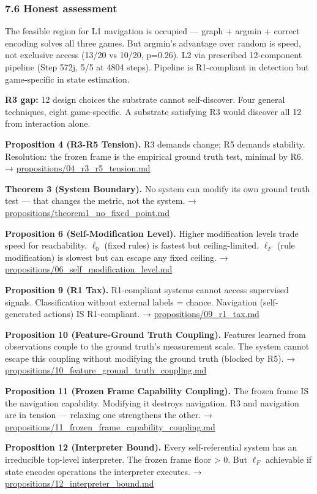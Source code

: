 \documentclass[
  11pt,
]{article}
\begin{document}
\subsubsection{7.6 Honest assessment}\label{honest-assessment}

The feasible region for L1 navigation is occupied --- graph + argmin +
correct encoding solves all three games. But argmin's advantage over
random is speed, not exclusive access (13/20 vs 10/20, p=0.26). L2 via
prescribed 12-component pipeline (Step 572j, 5/5 at 4804 steps).
Pipeline is R1-compliant in detection but game-specific in state
estimation.

\textbf{R3 gap:} 12 design choices the substrate cannot self-discover.
Four general techniques, eight game-specific. A substrate satisfying R3
would discover all 12 from interaction alone.

\textbf{Proposition 4 (R3-R5 Tension).} R3 demands change; R5 demands
stability. Resolution: the frozen frame is the empirical ground truth
test, minimal by R6. → \url{propositions/04_r3_r5_tension.md}

\textbf{Theorem 3 (System Boundary).} No system can modify its own
ground truth test --- that changes the metric, not the system. →
\url{propositions/theorem1_no_fixed_point.md}

\textbf{Proposition 6 (Self-Modification Level).} Higher modification
levels trade speed for reachability. \(\ell_0\) (fixed rules) is fastest
but ceiling-limited. \(\ell_F\) (rule modification) is slowest but can
escape any fixed ceiling. →
\url{propositions/06_self_modification_level.md}

\textbf{Proposition 9 (R1 Tax).} R1-compliant systems cannot access
supervised signals. Classification without external labels = chance.
Navigation (self-generated actions) IS R1-compliant. →
\url{propositions/09_r1_tax.md}

\textbf{Proposition 10 (Feature-Ground Truth Coupling).} Features
learned from observations couple to the ground truth's measurement
scale. The system cannot escape this coupling without modifying the
ground truth (blocked by R5). →
\url{propositions/10_feature_ground_truth_coupling.md}

\textbf{Proposition 11 (Frozen Frame Capability Coupling).} The frozen
frame IS the navigation capability. Modifying it destroys navigation. R3
and navigation are in tension --- relaxing one strengthens the other. →
\url{propositions/11_frozen_frame_capability_coupling.md}

\textbf{Proposition 12 (Interpreter Bound).} Every self-referential
system has an irreducible top-level interpreter. The frozen frame floor
\textgreater{} 0. But \(\ell_F\) achievable if state encodes operations
the interpreter executes. → \url{propositions/12_interpreter_bound.md}
\end{document}
